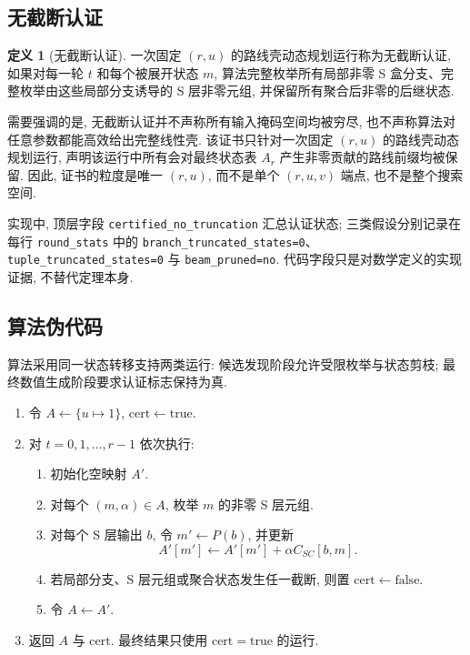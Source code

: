 \documentclass[UTF8,a4paper,zihao=-4,fontset=fandol]{ctexart}
\numberwithin{equation}{section}
\theoremstyle{definition}
\newtheorem{definition}{定义}
\theoremstyle{plain}
\theoremstyle{remark}
\newcommand{\code}[1]{\texttt{#1}}
\begin{document}
\subsection{无截断认证}

\begin{definition}[无截断认证]
一次固定 $(r,u)$ 的路线壳动态规划运行称为无截断认证, 如果对每一轮 $t$ 和每个被展开状态 $m$, 算法完整枚举所有局部非零 S 盒分支、完整枚举由这些局部分支诱导的 S 层非零元组, 并保留所有聚合后非零的后继状态.
\end{definition}

需要强调的是, 无截断认证并不声称所有输入掩码空间均被穷尽, 也不声称算法对任意参数都能高效给出完整线性壳. 该证书只针对一次固定 $(r,u)$ 的路线壳动态规划运行, 声明该运行中所有会对最终状态表 $A_r$ 产生非零贡献的路线前缀均被保留. 因此, 证书的粒度是唯一 $(r,u)$, 而不是单个 $(r,u,v)$ 端点, 也不是整个搜索空间.

实现中, 顶层字段 \code{certified\_no\_truncation} 汇总认证状态; 三类假设分别记录在每行 \code{round\_stats} 中的 \code{branch\_truncated\_states=0}、\code{tuple\_truncated\_states=0} 与 \code{beam\_pruned=no}. 代码字段只是对数学定义的实现证据, 不替代定理本身.

\subsection{算法伪代码}

算法采用同一状态转移支持两类运行: 候选发现阶段允许受限枚举与状态剪枝; 最终数值生成阶段要求认证标志保持为真.

\begin{center}
\begin{minipage}{0.94\textwidth}
\begin{enumerate}[label=\arabic*.,leftmargin=2.8em,itemsep=0.15em,topsep=0.35em]
  \item 令 $A\leftarrow\{u\mapsto 1\}$, $\mathrm{cert}\leftarrow\mathrm{true}$.
  \item 对 $t=0,1,\ldots,r-1$ 依次执行:
  \begin{enumerate}[label*=\arabic*.,leftmargin=2.5em,itemsep=0.1em]
    \item 初始化空映射 $A'$.
    \item 对每个 $(m,\alpha)\in A$, 枚举 $m$ 的非零 S 层元组.
    \item 对每个 S 层输出 $b$, 令 $m'\leftarrow P(b)$, 并更新
    \[
      A'[m']\leftarrow A'[m']+\alpha C_{SC}[b,m].
    \]
    \item 若局部分支、S 层元组或聚合状态发生任一截断, 则置 $\mathrm{cert}\leftarrow\mathrm{false}$.
    \item 令 $A\leftarrow A'$.
  \end{enumerate}
  \item 返回 $A$ 与 $\mathrm{cert}$. 最终结果只使用 $\mathrm{cert}=\mathrm{true}$ 的运行.
\end{enumerate}
\end{minipage}
\end{center}
\end{document}
